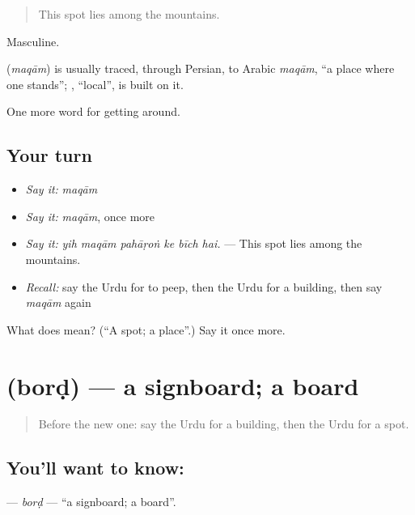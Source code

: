 \begin{quote}
This spot lies among the mountains.
\end{quote}

Masculine.

\begin{cousinweb}
\textbf{} (\emph{maqām}) is usually traced, through Persian, to Arabic \emph{maqām}, \textquotedblleft{}a place where one stands\textquotedblright{}; \textbf{}, \textquotedblleft{}local\textquotedblright{}, is built on it.
\end{cousinweb}

\begin{grammarlens}[title={What you've built}]
One more word for getting around.
\end{grammarlens}

\subsection*{Your turn}
\begin{itemize}
\raggedright
  \item \emph{Say it:} \emph{maqām}
  \item \emph{Say it:} \emph{maqām}, once more
  \item \emph{Say it:} \emph{yih maqām pahāṛoṅ ke bīch hai.} — This spot lies among the mountains.
  \item \emph{Recall:} say the Urdu for to peep, then the Urdu for a building, then say \emph{maqām} again
\end{itemize}

\begin{tcolorbox}[breakable,colback=teal!4,colframe=teal!35!black,title={Before you move on}]
What does  mean? (\textquotedblleft{}A spot; a place\textquotedblright{}.) Say it once more.
\end{tcolorbox}
\section[\texorpdfstring{\ur{بورڈ} (borḍ)}{بورڈ (borḍ)}]{ (borḍ) — a signboard; a board}

\label{lesson:UR-C410-bord}



\begin{quote}
Before the new one: say the Urdu for a building, then the Urdu for a spot.
\end{quote}

\subsection*{You'll want to know: }
\textbf{} — \emph{borḍ} — \textquotedblleft{}a signboard; a board\textquotedblright{}.

